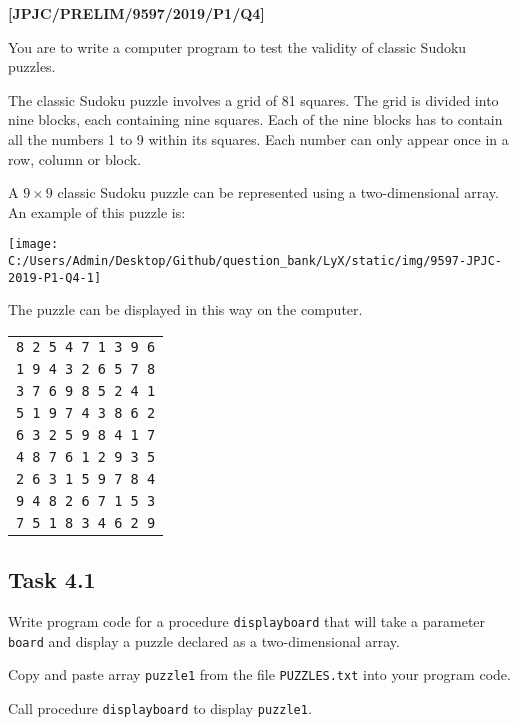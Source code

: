 \item \textbf{{[}JPJC/PRELIM/9597/2019/P1/Q4{]} }

You are to write a computer program to test the validity of classic
Sudoku puzzles. 

The classic Sudoku puzzle involves a grid of 81 squares. The grid
is divided into nine blocks, each containing nine squares. Each of
the nine blocks has to contain all the numbers 1 to 9 within its squares.
Each number can only appear once in a row, column or block. 

A $9\times9$ classic Sudoku puzzle can be represented using a two-dimensional
array. An example of this puzzle is:
\begin{center}
\texttt{[image: C:/Users/Admin/Desktop/Github/question\_bank/LyX/static/img/9597-JPJC-2019-P1-Q4-1]}
\par\end{center}

The puzzle can be displayed in this way on the computer. 
\noindent \begin{center}
\texttt{}%
\begin{tabular}{c}
\texttt{8 2 5 4 7 1 3 9 6}\tabularnewline
\texttt{1 9 4 3 2 6 5 7 8}\tabularnewline
\texttt{3 7 6 9 8 5 2 4 1}\tabularnewline
\texttt{5 1 9 7 4 3 8 6 2}\tabularnewline
\texttt{6 3 2 5 9 8 4 1 7}\tabularnewline
\texttt{4 8 7 6 1 2 9 3 5}\tabularnewline
\texttt{2 6 3 1 5 9 7 8 4}\tabularnewline
\texttt{9 4 8 2 6 7 1 5 3}\tabularnewline
\texttt{7 5 1 8 3 4 6 2 9}\tabularnewline
\end{tabular}
\par\end{center}

\noindent \begin{center}
\par\end{center}

\subsection*{Task 4.1 }

Write program code for a procedure \texttt{displayboard} that will
take a parameter \texttt{board} and display a puzzle declared as a
two-dimensional array. 

Copy and paste array \texttt{puzzle1} from the file \texttt{PUZZLES.txt}
into your program code. 

Call procedure \texttt{displayboard} to display \texttt{puzzle1}. 

